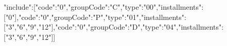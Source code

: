{"include":[{"code":"0","groupCode":"C","type":"00","installments":["0"]},{"code":"0","groupCode":"P","type":"01","installments":["3","6","9","12"]},{"code":"0","groupCode":"D","type":"04","installments":["3","6","9","12"]}]}